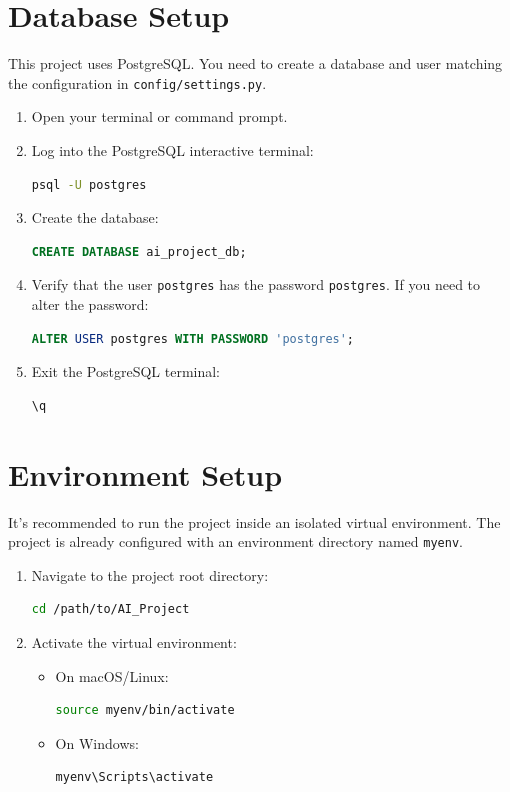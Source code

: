 \section{Database Setup}
This project uses PostgreSQL. You need to create a database and user matching the configuration in \texttt{config/settings.py}.
\begin{enumerate}
    \item Open your terminal or command prompt.
    \item Log into the PostgreSQL interactive terminal:
    \begin{lstlisting}[language=bash]
psql -U postgres
    \end{lstlisting}
    \item Create the database:
    \begin{lstlisting}[language=SQL]
CREATE DATABASE ai_project_db;
    \end{lstlisting}
    \item Verify that the user \texttt{postgres} has the password \texttt{postgres}. If you need to alter the password:
    \begin{lstlisting}[language=SQL]
ALTER USER postgres WITH PASSWORD 'postgres';
    \end{lstlisting}
    \item Exit the PostgreSQL terminal:
    \begin{lstlisting}[language=bash]
\q
    \end{lstlisting}
\end{enumerate}

\section{Environment Setup}
It's recommended to run the project inside an isolated virtual environment. The project is already configured with an environment directory named \texttt{myenv}.
\begin{enumerate}
    \item Navigate to the project root directory:
    \begin{lstlisting}[language=bash]
cd /path/to/AI_Project
    \end{lstlisting}
    \item Activate the virtual environment:
    \begin{itemize}
        \item On macOS/Linux:
        \begin{lstlisting}[language=bash]
source myenv/bin/activate
        \end{lstlisting}
        \item On Windows:
        \begin{lstlisting}[language=bash]
myenv\Scripts\activate
        \end{lstlisting}
    \end{itemize}
\end{enumerate}

